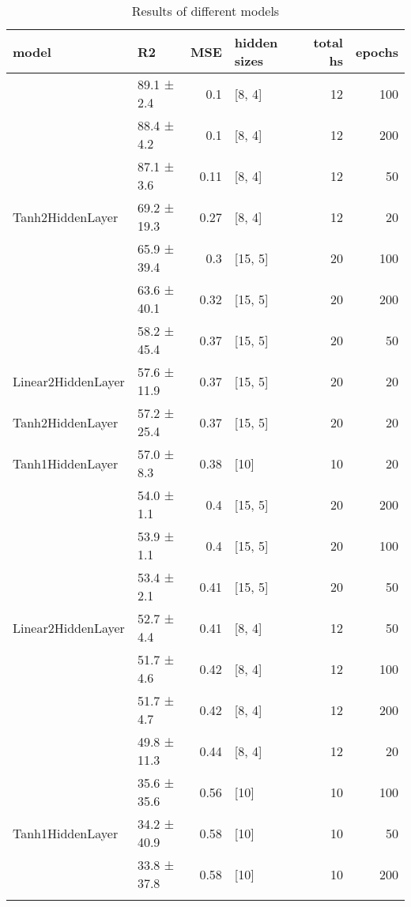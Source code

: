 
        \begin{longtable}{llrlrr}
\hline
 model   & R2          &   MSE & hidden sizes   &   total hs &   epochs \\
\hline
 \hline
\multirow{7}{*}{Tanh2HiddenLayer}         & 89.1 ± 2.4  &  0.1  & [8, 4]         &         12 &      100 \\
         & 88.4 ± 4.2  &  0.1  & [8, 4]         &         12 &      200 \\
         & 87.1 ± 3.6  &  0.11 & [8, 4]         &         12 &       50 \\
         & 69.2 ± 19.3 &  0.27 & [8, 4]         &         12 &       20 \\
         & 65.9 ± 39.4 &  0.3  & [15, 5]        &         20 &      100 \\
         & 63.6 ± 40.1 &  0.32 & [15, 5]        &         20 &      200 \\
         & 58.2 ± 45.4 &  0.37 & [15, 5]        &         20 &       50 \\
 \hline
Linear2HiddenLayer         & 57.6 ± 11.9 &  0.37 & [15, 5]        &         20 &       20 \\
 \hline
Tanh2HiddenLayer         & 57.2 ± 25.4 &  0.37 & [15, 5]        &         20 &       20 \\
 \hline
Tanh1HiddenLayer         & 57.0 ± 8.3  &  0.38 & [10]           &         10 &       20 \\
 \hline
\multirow{7}{*}{Linear2HiddenLayer}         & 54.0 ± 1.1  &  0.4  & [15, 5]        &         20 &      200 \\
         & 53.9 ± 1.1  &  0.4  & [15, 5]        &         20 &      100 \\
         & 53.4 ± 2.1  &  0.41 & [15, 5]        &         20 &       50 \\
         & 52.7 ± 4.4  &  0.41 & [8, 4]         &         12 &       50 \\
         & 51.7 ± 4.6  &  0.42 & [8, 4]         &         12 &      100 \\
         & 51.7 ± 4.7  &  0.42 & [8, 4]         &         12 &      200 \\
         & 49.8 ± 11.3 &  0.44 & [8, 4]         &         12 &       20 \\
 \hline
\multirow{3}{*}{Tanh1HiddenLayer}         & 35.6 ± 35.6 &  0.56 & [10]           &         10 &      100 \\
         & 34.2 ± 40.9 &  0.58 & [10]           &         10 &       50 \\
         & 33.8 ± 37.8 &  0.58 & [10]           &         10 &      200 \\
\hline
       \caption{Results of different models}
\label{models}

\end{longtable}
    
